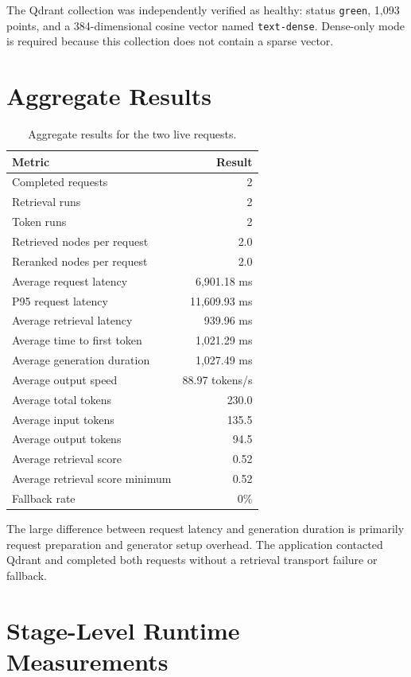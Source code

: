 \documentclass[11pt,a4paper]{article}
\begin{document}
The Qdrant collection was independently verified as healthy: status \texttt{green}, 1,093 points, and a 384-dimensional cosine vector named \texttt{text-dense}. Dense-only mode is required because this collection does not contain a sparse vector.

\section{Aggregate Results}

\begin{table}[ht]
\centering
\caption{Aggregate results for the two live requests.}
\begin{tabular}{lr}
\toprule
\textbf{Metric} & \textbf{Result} \\
\midrule
Completed requests & 2 \\
Retrieval runs & 2 \\
Token runs & 2 \\
Retrieved nodes per request & 2.0 \\
Reranked nodes per request & 2.0 \\
Average request latency & 6,901.18 ms \\
P95 request latency & 11,609.93 ms \\
Average retrieval latency & 939.96 ms \\
Average time to first token & 1,021.29 ms \\
Average generation duration & 1,027.49 ms \\
Average output speed & 88.97 tokens/s \\
Average total tokens & 230.0 \\
Average input tokens & 135.5 \\
Average output tokens & 94.5 \\
Average retrieval score & 0.52 \\
Average retrieval score minimum & 0.52 \\
Fallback rate & 0\% \\
\bottomrule
\end{tabular}
\end{table}

The large difference between request latency and generation duration is primarily request preparation and generator setup overhead. The application contacted Qdrant and completed both requests without a retrieval transport failure or fallback.

\section{Stage-Level Runtime Measurements}
\end{document}
